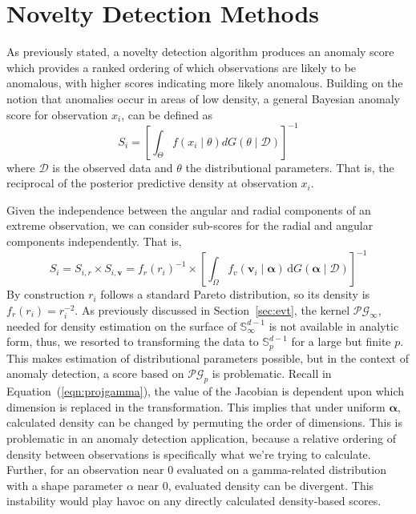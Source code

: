 \section{Novelty Detection Methods\label{sec:novelty}}
As previously stated, a novelty detection algorithm produces an anomaly score 
    which provides a ranked ordering of which observations are likely to be 
    anomalous, with higher scores indicating more likely anomalous. Building on 
    the notion that anomalies occur in areas of low density, a general Bayesian
    anomaly score for observation $x_i$, can be defined as
    \[
    S_i = \left[\int_{\Theta}f(x_i\mid\theta)dG(\theta\mid\mathcal{D})\right]^{-1}
    \]
    where $\mathcal{D}$ is the observed data and $\theta$ the distributional
    parameters.  That is, the reciprocal of the posterior predictive density 
    at observation $x_i$.

Given the independence between the angular and radial components of an
    extreme observation, we can consider sub-scores for the radial 
    and angular components independently.  That is,
    \[
        S_i = S_{i,r}\times S_{i,\bm{v}} = 
            f_r(r_i)^{-1}\times
            \left[\int_{\Omega} f_v(\bm{v}_i\mid\bm{\alpha})
                \,\text{d}G(\bm{\alpha}\mid\mathcal{D})\right]^{-1}
    \]
    By construction $r_i$ follows a standard Pareto distribution, so its
    density is $f_r(r_i) = r_i^{-2}$.  As previously discussed in
    Section~\ref{sec:evt}, the kernel $\mathcal{PG}_\infty$, needed for 
    density estimation on the surface of ${\mathbb S}_{\infty}^{d-1}$ is 
    not available in analytic form, thus, we resorted to transforming the
    data to $\mathbb{S}_p^{d-1}$ for a large but finite $p$.
    This makes estimation of distributional parameters possible, 
    but in the context of anomaly detection, a score based on
    $\mathcal{PG}_p$ is problematic.  Recall in 
    Equation~(\ref{eqn:projgamma}), the value of the Jacobian is dependent
    upon which dimension is replaced in the transformation.  This implies that
    under uniform $\bm{\alpha}$, calculated density can be changed by
    permuting the order of dimensions.  This is problematic in an anomaly
    detection application, because a relative ordering of density between 
    observations is specifically what we're trying to calculate.
    Further, for an observation near 0 evaluated on a gamma-related distribution 
    with a shape parameter $\alpha$ near 0, evaluated density can be divergent.
    This instability would play havoc on any directly 
    calculated density-based scores.

